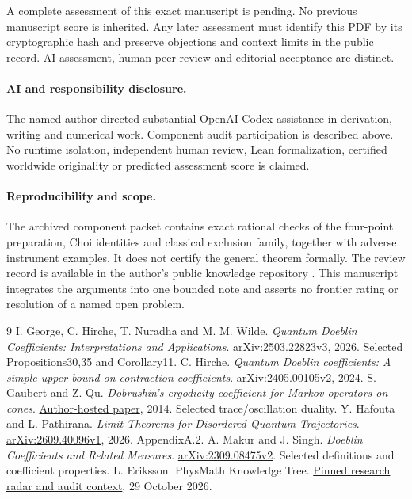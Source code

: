 \documentclass[11pt]{article}
\begin{document}
A complete assessment of this exact manuscript is pending. No previous manuscript score is inherited. Any later assessment must identify this PDF by its cryptographic hash and preserve objections and context limits in the public record. AI assessment, human peer review and editorial acceptance are distinct.

\paragraph{AI and responsibility disclosure.}
The named author directed substantial OpenAI Codex assistance in derivation, writing and numerical work. Component audit participation is described above. No runtime isolation, independent human review, Lean formalization, certified worldwide originality or predicted assessment score is claimed.

\paragraph{Reproducibility and scope.}
The archived component packet contains exact rational checks of the four-point preparation, Choi identities and classical exclusion family, together with adverse instrument examples. It does not certify the general theorem formally. The review record is available in the author's public knowledge repository \cite{repo}. This manuscript integrates the arguments into one bounded note and asserts no frontier rating or resolution of a named open problem.

\begin{thebibliography}{9}
 I. George, C. Hirche, T. Nuradha and M. M. Wilde.
\emph{Quantum Doeblin Coefficients: Interpretations and Applications}.
\href{https://arxiv.org/abs/2503.22823v3}{arXiv:2503.22823v3}, 2026. Selected Propositions30,35 and Corollary11.
 C. Hirche.
\emph{Quantum Doeblin coefficients: A simple upper bound on contraction coefficients}.
\href{https://arxiv.org/abs/2405.00105v2}{arXiv:2405.00105v2}, 2024.
 S. Gaubert and Z. Qu.
\emph{Dobrushin's ergodicity coefficient for Markov operators on cones}.
\href{https://www.cmap.polytechnique.fr/~gaubert/PAPERS/GaubertQuIEOTD14QuFinal.pdf}{Author-hosted paper}, 2014. Selected trace/oscillation duality.
 Y. Hafouta and L. Pathirana.
\emph{Limit Theorems for Disordered Quantum Trajectories}.
\href{https://arxiv.org/abs/2609.40096v1}{arXiv:2609.40096v1}, 2026. AppendixA.2.
 A. Makur and J. Singh.
\emph{Doeblin Coefficients and Related Measures}.
\href{https://arxiv.org/abs/2309.08475v2}{arXiv:2309.08475v2}. Selected definitions and coefficient properties.
 L. Eriksson. PhysMath Knowledge Tree.
\href{https://github.com/lluiseriksson/physmath-knowledge-tree/tree/430b7072bf5efe11f5636d282eb68304d74f8292/integrations/research-radar}{Pinned research radar and audit context}, 29 October 2026.
\end{thebibliography}
\end{document}
